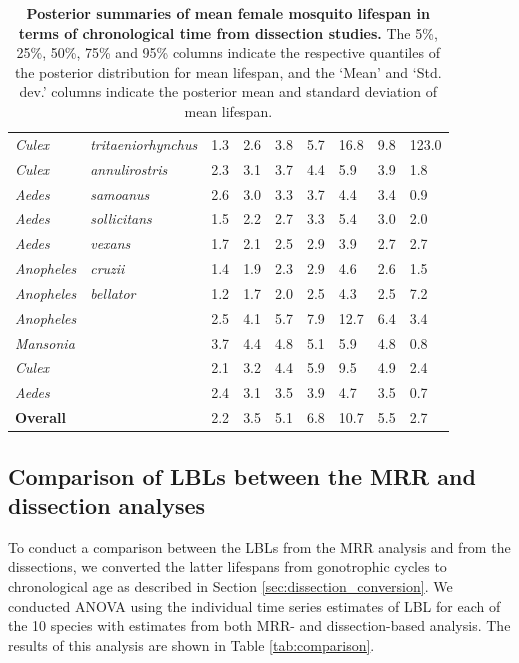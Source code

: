 \documentclass[12pt]{article}
\begin{document}
{\begin{table}[htbp!]
\begin{tabular}{l|l|l|l|l|l|l|l|l}
		\textit{Culex} & \textit{tritaeniorhynchus} & 1.3 & 2.6 & 3.8 & 5.7 & 16.8 & 9.8 & 123.0 \\
		\textit{Culex} & \textit{annulirostris} & 2.3 & 3.1 & 3.7 & 4.4 & 5.9 & 3.9 & 1.8 \\
		\textit{Aedes} & \textit{samoanus} & 2.6 & 3.0 & 3.3 & 3.7 & 4.4 & 3.4 & 0.9 \\
		\textit{Aedes} & \textit{sollicitans} & 1.5 & 2.2 & 2.7 & 3.3 & 5.4 & 3.0 & 2.0 \\
		\textit{Aedes} & \textit{vexans} & 1.7 & 2.1 & 2.5 & 2.9 & 3.9 & 2.7 & 2.7 \\
		\textit{Anopheles} & \textit{cruzii} & 1.4 & 1.9 & 2.3 & 2.9 & 4.6 & 2.6 & 1.5 \\
		\textit{Anopheles} & \textit{bellator} & 1.2 & 1.7 & 2.0 & 2.5 & 4.3 & 2.5 & 7.2 \\
		\hline
		\textit{Anopheles} & \textit{} & 2.5 & 4.1 & 5.7 & 7.9 & 12.7 & 6.4 & 3.4 \\
		\textit{Mansonia} & \textit{} & 3.7 & 4.4 & 4.8 & 5.1 & 5.9 & 4.8 & 0.8 \\
		\textit{Culex} & \textit{} & 2.1 & 3.2 & 4.4 & 5.9 & 9.5 & 4.9 & 2.4 \\
		\textit{Aedes} & \textit{} & 2.4 & 3.1 & 3.5 & 3.9 & 4.7 & 3.5 & 0.7 \\
		\hline
		\textbf{Overall} & \textit{} & 2.2 & 3.5 & 5.1 & 6.8 & 10.7 & 5.5 & 2.7 \\
	\end{tabular}
	\caption{\textbf{Posterior summaries of mean female mosquito lifespan in terms of chronological time from dissection studies.} The 5\%, 25\%, 50\%, 75\% and 95\% columns indicate the respective quantiles of the posterior distribution for mean lifespan, and the `Mean' and `Std. dev.' columns indicate the posterior mean and standard deviation of mean lifespan.}
	\label{tab:dissection_estimated_lifespans_chron}%
\end{table}

\subsection{Comparison of LBLs between the MRR and dissection analyses}
To conduct a comparison between the LBLs from the MRR analysis and from the dissections, we converted the latter lifespans from gonotrophic cycles to chronological age as described in Section \ref{sec:dissection_conversion}. We conducted ANOVA using the individual time series estimates of LBL for each of the 10 species with estimates from both MRR- and dissection-based analysis. The results of this analysis are shown in Table \ref{tab:comparison}.

}
\end{document}
